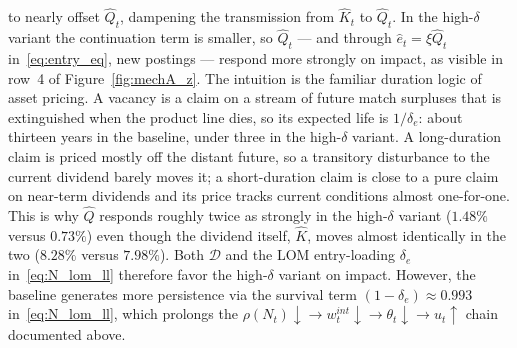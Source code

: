 \documentclass[authoryear, review, 12pt]{elsarticle}
\begin{document}
	to nearly offset $\hat{Q}_t$, dampening the transmission from
	$\hat{K}_t$ to $\hat{Q}_t$.  In the high-$\delta$ variant the
	continuation term is smaller, so $\hat{Q}_t$ — and through
	$\hat{e}_t=\xi\hat{Q}_t$ in~\eqref{eq:entry_eq}, new
	postings — respond more strongly on impact, as visible in
	row~4 of Figure~\ref{fig:mechA_z}.
	The intuition is the familiar duration logic of asset pricing.  A
	vacancy is a claim on a stream of future match surpluses that is
	extinguished when the product line dies, so its expected life is
	$1/\delta_e$: about thirteen years in the baseline, under three in the
	high-$\delta$ variant.  A long-duration claim is priced mostly off the
	distant future, so a transitory disturbance to the current dividend
	barely moves it; a short-duration claim is close to a pure claim on
	near-term dividends and its price tracks current conditions almost
	one-for-one.  This is why $\hat{Q}$ responds roughly twice as strongly
	in the high-$\delta$ variant ($1.48\%$ versus $0.73\%$) even though the
	dividend itself, $\hat{K}$, moves almost identically in the two
	($8.28\%$ versus $7.98\%$).
	Both $\mathcal{D}$ and the LOM entry-loading $\delta_e$
	in~\eqref{eq:N_lom_ll} therefore favor the high-$\delta$
	variant on impact.  However, the baseline generates more persistence via the survival term $(1-\delta_e)\approx0.993$
	in~\eqref{eq:N_lom_ll}, which prolongs the
	$\rho(N_t)\downarrow\to w_t^{int}\downarrow\to\theta_t\downarrow\to u_t\uparrow$
	chain documented above.
	
\end{document}

